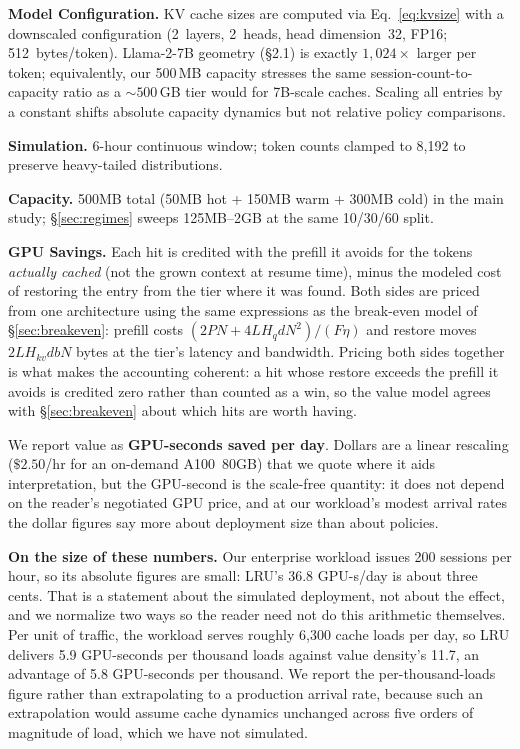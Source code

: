 \documentclass[letterpaper,twocolumn,10pt]{article}
\begin{document}
\textbf{Model Configuration.} KV cache sizes are computed via Eq.~\ref{eq:kvsize} with a downscaled configuration (2~layers, 2~heads, head dimension~32, FP16; 512~bytes/token). Llama-2-7B geometry (\S2.1) is exactly $1{,}024\times$ larger per token; equivalently, our 500\,MB capacity stresses the same session-count-to-capacity ratio as a ${\sim}500$\,GB tier would for 7B-scale caches. Scaling all entries by a constant shifts absolute capacity dynamics but not relative policy comparisons.

\textbf{Simulation.} 6-hour continuous window; token counts clamped to 8,192 to preserve heavy-tailed distributions.

\textbf{Capacity.} 500MB total (50MB hot + 150MB warm + 300MB cold) in the main study; \S\ref{sec:regimes} sweeps 125MB--2GB at the same 10/30/60 split.

\textbf{GPU Savings.} Each hit is credited with the prefill it avoids for the tokens \emph{actually cached} (not the grown context at resume time), minus the modeled cost of restoring the entry from the tier where it was found. Both sides are priced from one architecture using the same expressions as the break-even model of \S\ref{sec:breakeven}: prefill costs $(2PN + 4LH_qdN^2)/(F\eta)$ and restore moves $2LH_{kv}db N$ bytes at the tier's latency and bandwidth. Pricing both sides together is what makes the accounting coherent: a hit whose restore exceeds the prefill it avoids is credited zero rather than counted as a win, so the value model agrees with \S\ref{sec:breakeven} about which hits are worth having.

We report value as \textbf{GPU-seconds saved per day}. Dollars are a linear rescaling ($\$2.50$/hr for an on-demand A100~80GB) that we quote where it aids interpretation, but the GPU-second is the scale-free quantity: it does not depend on the reader's negotiated GPU price, and at our workload's modest arrival rates the dollar figures say more about deployment size than about policies.

\textbf{On the size of these numbers.} Our enterprise workload issues 200 sessions per hour, so its absolute figures are small: LRU's 36.8 GPU-s/day is about three cents. That is a statement about the simulated deployment, not about the effect, and we normalize two ways so the reader need not do this arithmetic themselves. Per unit of traffic, the workload serves roughly 6{,}300 cache loads per day, so LRU delivers 5.9 GPU-seconds per thousand loads against value density's 11.7, an advantage of 5.8 GPU-seconds per thousand. We report the per-thousand-loads figure rather than extrapolating to a production arrival rate, because such an extrapolation would assume cache dynamics unchanged across five orders of magnitude of load, which we have not simulated.
\end{document}

